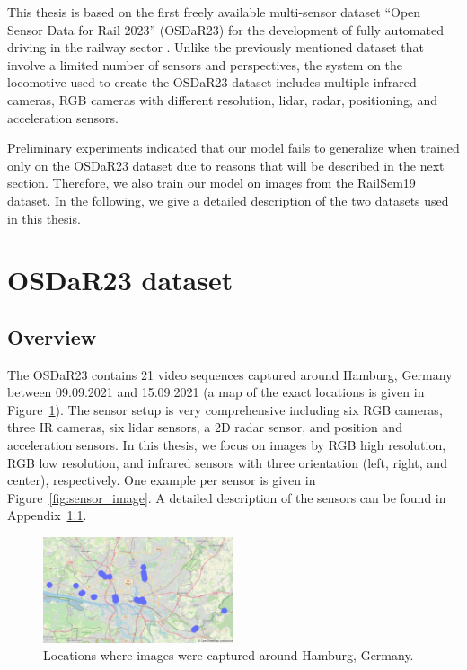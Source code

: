 \documentclass[Master,MDS,english]{BASE/twbook} %
\begin{document}
This thesis is based on the first freely available multi-sensor dataset ``Open Sensor Data for Rail 2023'' (OSDaR23) for the development of fully automated driving in the railway sector \citep{DB2023, tagiew2023osdar23}.
Unlike the previously mentioned dataset that involve a limited number of sensors and perspectives, the system on the locomotive used to create the OSDaR23 dataset includes multiple infrared cameras, RGB cameras with different resolution, lidar, radar, positioning, and acceleration sensors.

Preliminary experiments indicated that our model fails to generalize when trained only on the OSDaR23 dataset due to reasons that will be described in the next section. Therefore, we also train our model on images from the RailSem19 dataset.
In the following, we give a detailed description of the two datasets used in this thesis.


\section{OSDaR23 dataset} \label{sec:OSDaR23}

\subsection{Overview}

The OSDaR23 contains 21 video sequences captured around Hamburg, Germany between 09.09.2021 and 15.09.2021 (a map of the exact locations is given in Figure~\ref{fig:map}). 
The sensor setup is very comprehensive including six RGB cameras, three
IR cameras, six lidar sensors, a 2D radar sensor, and position and acceleration sensors. In this thesis, we focus on images by RGB high resolution, RGB low resolution, and infrared sensors with three orientation (left, right, and center), respectively. One example per sensor is given in Figure~\ref{fig:sensor_image}. A detailed description of the sensors can be found in Appendix~\ref{}.

\begin{figure}[h]
\centering
\includegraphics[width=0.5\textwidth]{images/datasets/db/map}
\caption{Locations where images were captured around Hamburg, Germany. }
\label{fig:map}
\end{figure}
\end{document}

